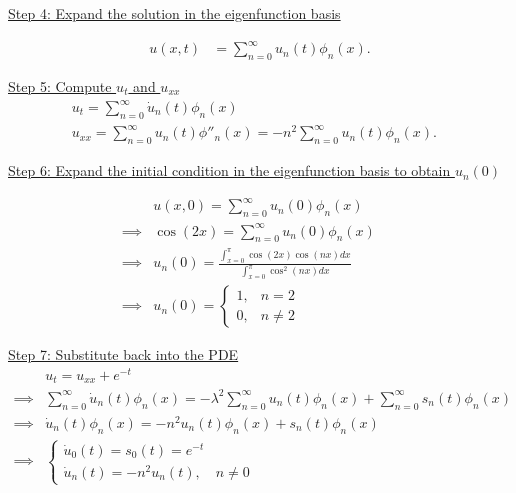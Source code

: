 \documentclass{article}
\begin{document}
\noindent
\underline{Step 4: Expand the solution in the eigenfunction basis}
\newline

\begin{align*}
  u(x, t) &= \sum_{n=0}^{\infty} u_n(t) \phi_n(x).
\end{align*}

\noindent
\underline{Step 5: Compute $u_{t}$ and $u_{xx}$}
\newline
\begin{align*}
  &u_{t} = \sum_{n=0}^{\infty} \dot{u}_n(t) \phi_n(x) &&\\
  &u_{xx} = \sum_{n=0}^{\infty} u_n(t) \phi''_n(x) = - n^2 \sum_{n=0}^{\infty} u_n(t) \phi_n(x).
\end{align*}

\noindent
\underline{Step 6: Expand the initial condition in the eigenfunction basis to obtain $u_n(0)$}
\newline

\begin{align*}
  &u(x, 0) = \sum_{n=0}^{\infty} u_n(0) \phi_n(x) &&\\
  \implies& \cos(2x) = \sum_{n=0}^{\infty} u_n(0) \phi_n(x) &&\\
  \implies&u_n(0) = \frac{\int_{x=0}^{\pi} \cos(2x) \cos(n x) dx}{\int_{x=0}^{\pi} \cos^2(n x) dx} &&\\
  \implies& u_n(0) = \begin{cases}
    1, &n = 2 \\
    0, &n \neq 2
  \end{cases}
\end{align*}

\noindent
\underline{Step 7: Substitute back into the PDE}
\newline
\begin{align*}
  &u_t = u_{xx} + e^{-t} &&\\
  \implies& \sum_{n=0}^{\infty} \dot{u}_n(t) \phi_n(x) 
  = -\lambda^2 \sum_{n=0}^{\infty} u_n(t) \phi_n(x)
  + \sum_{n=0}^{\infty} s_n(t) \phi_n(x) &&\\
  \implies& \dot{u}_n(t) \phi_n(x) 
  = - n^2 u_n(t) \phi_n(x)
  + s_n(t) \phi_n(x) &&\\
  \implies&\begin{cases}
    \dot{u}_0(t) = s_0(t) = e^{-t}  \\
    \dot{u}_n(t) = - n^2 u_n(t), \quad n \neq 0
  \end{cases} \\
\end{align*}
\end{document}
